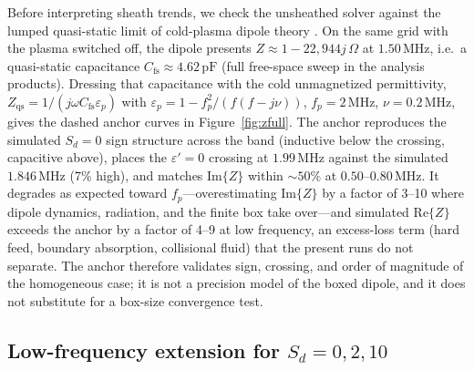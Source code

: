 \documentclass[draft]{agujournal2025}
\begin{document}
Before interpreting sheath trends, we check the unsheathed solver against the lumped quasi-static limit of cold-plasma dipole theory \cite{balmain1964}. On the same grid with the plasma switched off, the dipole presents \(Z\approx 1-22{,}944j\,\Omega\) at \(1.50\,\mathrm{MHz}\), i.e.\ a quasi-static capacitance \(C_\mathrm{fs}\approx 4.62\,\mathrm{pF}\) (full free-space sweep in the analysis products). Dressing that capacitance with the cold unmagnetized permittivity, \(Z_\mathrm{qs}=1/(j\omega C_\mathrm{fs}\varepsilon_p)\) with \(\varepsilon_p=1-f_p^2/(f(f-j\nu))\), \(f_p=2\,\mathrm{MHz}\), \(\nu=0.2\,\mathrm{MHz}\), gives the dashed anchor curves in Figure~\ref{fig:zfull}. The anchor reproduces the simulated \(S_d=0\) sign structure across the band (inductive below the crossing, capacitive above), places the \(\varepsilon'=0\) crossing at \(1.99\,\mathrm{MHz}\) against the simulated \(1.846\,\mathrm{MHz}\) (7\% high), and matches \(\mathrm{Im}\{Z\}\) within \(\sim 50\%\) at \(0.50\)--\(0.80\,\mathrm{MHz}\). It degrades as expected toward \(f_p\)---overestimating \(\mathrm{Im}\{Z\}\) by a factor of 3--10 where dipole dynamics, radiation, and the finite box take over---and simulated \(\mathrm{Re}\{Z\}\) exceeds the anchor by a factor of 4--9 at low frequency, an excess-loss term (hard feed, boundary absorption, collisional fluid) that the present runs do not separate. The anchor therefore validates sign, crossing, and order of magnitude of the homogeneous case; it is not a precision model of the boxed dipole, and it does not substitute for a box-size convergence test.

\subsection{Low-frequency extension for \(S_d=0,2,10\)}
\end{document}
